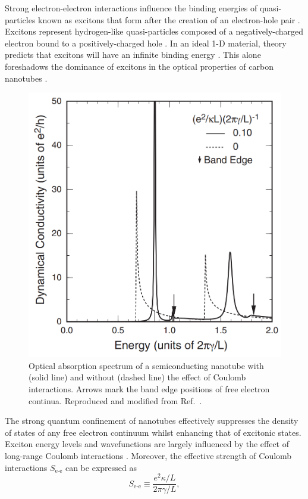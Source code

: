 Strong electron-electron interactions influence the binding energies of quasi-particles known as excitons that form after the creation of an electron-hole pair \cite{koch2006semiconductor}. Excitons represent hydrogen-like quasi-particles composed of a negatively-charged electron bound to a positively-charged hole \cite{koch2006semiconductor}. In an ideal 1-D material, theory predicts that excitons will have an infinite binding energy \cite{ando2005theory}. This alone foreshadows the dominance of excitons in the optical properties of carbon nanotubes \cite{ando2005theory}.

\begin{figure}[ht]
	\centering
	\includegraphics[scale=0.3]{images/chapter_optical_props/ando_suppression}
	\caption{Optical absorption spectrum of a semiconducting nanotube with (solid line) and without (dashed line) the effect of Coulomb interactions. Arrows mark the band edge positions of free electron continua. Reproduced and modified from Ref.\ \cite{ando2005theory}.}
	\label{fig:ando_suppression}
\end{figure}

The strong quantum confinement of nanotubes effectively suppresses the density of states of any free electron continuum whilst enhancing that of excitonic states. Exciton energy levels and wavefunctions are largely influenced by the effect of long-range Coulomb interactions \cite{ando2006effects}. Moreover, the effective strength of Coulomb interactions $S_\text{e-e}$ can be expressed as
\begin{equation}
	S_\text{e-e} \equiv \dfrac{e^2 \kappa / L}{2 \pi \gamma / L},
\end{equation}

